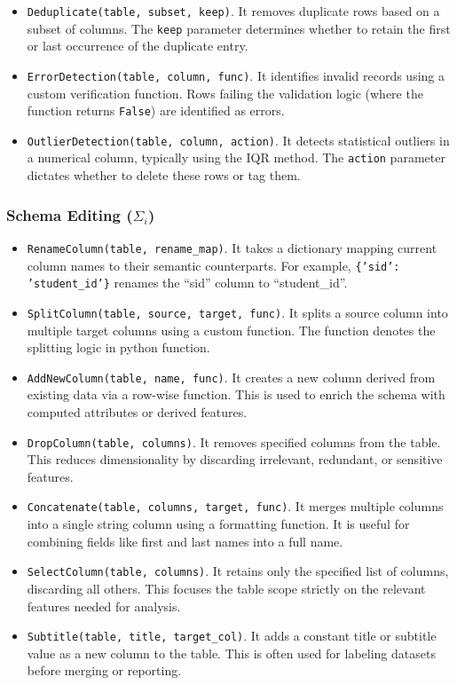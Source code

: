 \begin{itemize}[leftmargin=*]
    \item \texttt{Deduplicate(table, subset, keep)}. It removes duplicate rows based on a subset of columns. The \texttt{keep} parameter determines whether to retain the first or last occurrence of the duplicate entry.
    \item \texttt{ErrorDetection(table, column, func)}. It identifies invalid records using a custom verification function. Rows failing the validation logic (where the function returns \texttt{False}) are identified as errors.
    \item \texttt{OutlierDetection(table, column, action)}. It detects statistical outliers in a numerical column, typically using the IQR method. The \texttt{action} parameter dictates whether to delete these rows or tag them.
\end{itemize}

\subsubsection{Schema Editing ($\Sigma_i$)}
\begin{itemize}[leftmargin=1em]
    \item \texttt{RenameColumn(table, rename\_map)}. It takes a dictionary mapping current column names to their semantic counterparts. For example, \texttt{\{'sid': 'student\_id'\}} renames the ``sid'' column to ``student\_id''.
    \item \texttt{SplitColumn(table, source, target, func)}. It splits a source column into multiple target columns using a custom function. The function denotes the splitting logic in python function.
    \item \texttt{AddNewColumn(table, name, func)}. It creates a new column derived from existing data via a row-wise function. This is used to enrich the schema with computed attributes or derived features.
    \item \texttt{DropColumn(table, columns)}. It removes specified columns from the table. This reduces dimensionality by discarding irrelevant, redundant, or sensitive features.
    \item \texttt{Concatenate(table, columns, target, func)}. It merges multiple columns into a single string column using a formatting function. It is useful for combining fields like first and last names into a full name.
    \item \texttt{SelectColumn(table, columns)}. It retains only the specified list of columns, discarding all others. This focuses the table scope strictly on the relevant features needed for analysis.
    \item \texttt{Subtitle(table, title, target\_col)}. It adds a constant title or subtitle value as a new column to the table. This is often used for labeling datasets before merging or reporting.
\end{itemize}

